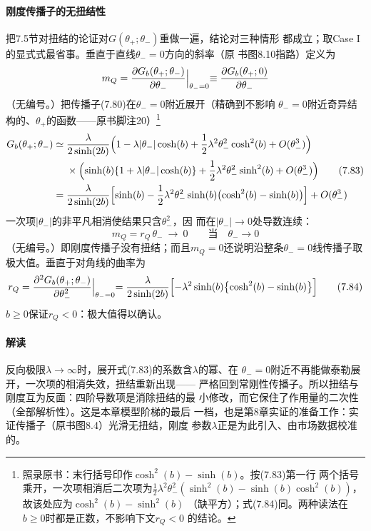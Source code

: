 \paragraph{刚度传播子的无扭结性}
把7.5节对扭结的论证对$G(\theta_{+};\theta_{-})$重做一遍，结论对三种情形
都成立；取Case I的显式式最省事。垂直于直线$\theta_{-}=0$方向的斜率（原
书图8.10指路）定义为
\begin{equation*}
m_{Q}=\frac{\partial G_{b}(\theta_{+};\theta_{-})}{\partial\theta_{-}}
\Bigl|_{\theta_{-}=0}\equiv\frac{\partial G_{b}(\theta_{+};0)}
{\partial\theta_{-}}
\end{equation*}
（无编号。）把传播子(7.80)在$\theta_{-}=0$附近展开（精确到不影响
$\theta_{-}=0$附近奇异结构的、$\theta_{+}$的函数——原书脚注20）\footnote{照录原书：末行括号印作$\cosh^{2}(b)-\sinh(b)$。按(7.83)第一行
两个括号乘开，一次项相消后二次项为$\frac{1}{2}\lambda^{2}\theta_{-}^{2}
(\sinh^{2}(b)-\sinh(b)\cosh^{2}(b))$，故该处应为$\cosh^{2}(b)-\sinh^{2}(b)$
（缺平方）；式(7.84)同。两种读法在$b\ge0$时都是正数，不影响下文$r_{Q}<0$
的结论。}
\begin{align*}
G_{b}(\theta_{+};\theta_{-})\simeq{}&\frac{\lambda}{2\sinh(2b)}
\Bigl(1-\lambda|\theta_{-}|\cosh(b)+\frac{1}{2}\lambda^{2}\theta_{-}^{2}
\cosh^{2}(b)+O(\theta_{-}^{3})\Bigr)\\
&\times\Bigl(\sinh(b)\{1+\lambda|\theta_{-}|\cosh(b)\}
+\frac{1}{2}\lambda^{2}\theta_{-}^{2}\sinh^{2}(b)+O(\theta_{-}^{3})\Bigr)
\tag{7.83}\\
={}&\frac{\lambda}{2\sinh(2b)}\Bigl[\sinh(b)-\frac{1}{2}\lambda^{2}
\theta_{-}^{2}\sinh(b)\bigl(\cosh^{2}(b)-\sinh(b)\bigr)\Bigr]+O(\theta_{-}^{3})
\end{align*}一次项$|\theta_{-}|$的非平凡相消使结果只含$\theta_{-}^{2}$，因
而在$|\theta_{-}|\to0$处导数连续：
\begin{equation*}
m_{Q}=r_{Q}\,\theta_{-}\ \longrightarrow\ 0
\qquad\text{当}\quad\theta_{-}\to0
\end{equation*}
（无编号。）即刚度传播子没有扭结；而且$m_{Q}=0$还说明沿整条$\theta_{-}=
0$线传播子取极大值。垂直于对角线的曲率为
\begin{equation*}
r_{Q}=\frac{\partial^{2}G_{b}(\theta_{+};\theta_{-})}{\partial\theta_{-}^{2}}
\Bigl|_{\theta_{-}=0}
=\frac{\lambda}{2\sinh(2b)}\Bigl[-\lambda^{2}\sinh(b)\bigl\{\cosh^{2}(b)
-\sinh(b)\bigr\}\Bigr]
\tag{7.84}
\end{equation*}
$b\ge0$保证$r_{Q}<0$：极大值得以确认。

\paragraph{解读}
反向极限$\lambda\to\infty$时，展开式(7.83)的系数含$\lambda$的幂、在
$\theta_{-}=0$附近不再能做泰勒展开，一次项的相消失效，扭结重新出现——
严格回到常刚性传播子。所以扭结与刚度互为反面：四阶导数项是消除扭结的最
小修改，而它保住了作用量的二次性（全部解析性）。这是本章模型阶梯的最后
一档，也是第8章实证的准备工作：实证传播子（原书图8.4）光滑无扭结，刚度
参数$\lambda$正是为此引入、由市场数据校准的。

